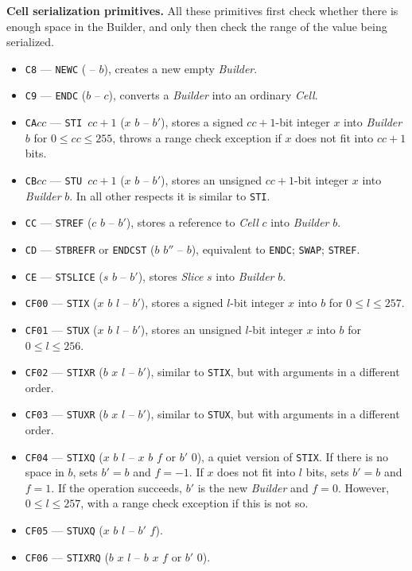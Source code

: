 \documentclass[12pt,oneside]{article}
\def\makepoint#1{\medbreak\noindent{\bf #1.\ }}
\def\nxsubpoint{\refstepcounter{subsubsection}%
  \smallbreak\makepoint{\thesubsubsection}}
\def\emb#1{\textbf{#1.}}
\begin{document}
\nxsubpoint\emb{Cell serialization primitives}\label{sp:prim.ser}
All these primitives first check whether there is enough space in the Builder, and only then check the range of the value being serialized.
\begin{itemize}
\item {\tt C8} --- {\tt NEWC} ( -- $b$), creates a new empty {\em Builder}.
\item {\tt C9} --- {\tt ENDC} ($b$ -- $c$), converts a {\em Builder} into an ordinary {\em Cell}.
\item {\tt CA$cc$} --- {\tt STI $cc+1$} ($x$ $b$ -- $b'$), stores a signed $cc+1$-bit integer $x$ into {\em Builder\/} $b$ for $0\leq cc\leq 255$, throws a range check exception if $x$ does not fit into $cc+1$ bits.
\item {\tt CB$cc$} --- {\tt STU $cc+1$} ($x$ $b$ -- $b'$), stores an unsigned $cc+1$-bit integer $x$ into {\em Builder\/} $b$. In all other respects it is similar to {\tt STI}.
\item {\tt CC} --- {\tt STREF} ($c$ $b$ -- $b'$), stores a reference to {\em Cell\/} $c$ into {\em Builder\/} $b$.
\item {\tt CD} --- {\tt STBREFR} or {\tt ENDCST} ($b$ $b''$ -- $b$), equivalent to {\tt ENDC}; {\tt SWAP}; {\tt STREF}.
\item {\tt CE} --- {\tt STSLICE} ($s$ $b$ -- $b'$), stores {\em Slice\/} $s$ into {\em Builder\/} $b$.
\item {\tt CF00} --- {\tt STIX} ($x$ $b$ $l$ -- $b'$), stores a signed $l$-bit integer $x$ into $b$ for $0\leq l\leq 257$.
\item {\tt CF01} --- {\tt STUX} ($x$ $b$ $l$ -- $b'$), stores an unsigned $l$-bit integer $x$ into $b$ for $0\leq l\leq 256$.
\item {\tt CF02} --- {\tt STIXR} ($b$ $x$ $l$ -- $b'$), similar to {\tt STIX}, but with arguments in a different order.
\item {\tt CF03} --- {\tt STUXR} ($b$ $x$ $l$ -- $b'$), similar to {\tt STUX}, but with arguments in a different order.
\item {\tt CF04} --- {\tt STIXQ} ($x$ $b$ $l$ -- $x$ $b$ $f$ or $b'$ $0$), a quiet version of {\tt STIX}. If there is no space in $b$, sets $b'=b$ and $f=-1$. If $x$ does not fit into $l$ bits, sets $b'=b$ and $f=1$. If the operation succeeds, $b'$ is the new {\em Builder\/} and $f=0$. However, $0\leq l\leq 257$, with a range check exception if this is not so.
\item {\tt CF05} --- {\tt STUXQ} ($x$ $b$ $l$ -- $b'$ $f$).
\item {\tt CF06} --- {\tt STIXRQ} ($b$ $x$ $l$ -- $b$ $x$ $f$ or $b'$ $0$).

\end{itemize}
\end{document}
